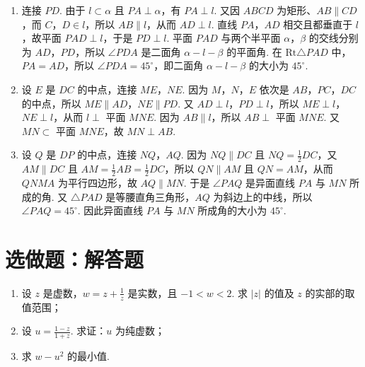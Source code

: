 \begin{solution}
\begin{enumerate}
\item 连接 \(PD\). 由于 \(l\subset\alpha\) 且 \(PA\perp\alpha\)，有 \(PA\perp l\). 又因 \(ABCD\) 为矩形、\(AB\parallel CD\)，而 \(C\)，\(D\in l\)，所以 \(AB\parallel l\)，从而 \(AD\perp l\). 直线 \(PA\)，\(AD\) 相交且都垂直于 \(l\)，故平面 \(PAD\perp l\)，于是 \(PD\perp l\). 平面 \(PAD\) 与两个半平面 \(\alpha\)，\(\beta\) 的交线分别为 \(AD\)，\(PD\)，所以 \(\angle PDA\) 是二面角 \(\alpha-l-\beta\) 的平面角. 在 \(\mathrm{Rt}\triangle PAD\) 中，\(PA=AD\)，所以 \(\angle PDA=45^\circ\)，即二面角 \(\alpha-l-\beta\) 的大小为 \(45^\circ\).
\item 设 \(E\) 是 \(DC\) 的中点，连接 \(ME\)，\(NE\). 因为 \(M\)，\(N\)，\(E\) 依次是 \(AB\)，\(PC\)，\(DC\) 的中点，所以 \(ME\parallel AD\)，\(NE\parallel PD\). 又 \(AD\perp l\)，\(PD\perp l\)，所以 \(ME\perp l\)，\(NE\perp l\)，从而 \(l\perp\) 平面 \(MNE\). 因为 \(AB\parallel l\)，所以 \(AB\perp\) 平面 \(MNE\). 又 \(MN\subset\) 平面 \(MNE\)，故 \(MN\perp AB\).
\item 设 \(Q\) 是 \(DP\) 的中点，连接 \(NQ\)，\(AQ\). 因为 \(NQ\parallel DC\) 且 \(NQ=\frac{1}{2}DC\)，又 \(AM\parallel DC\) 且 \(AM=\frac{1}{2}AB=\frac{1}{2}DC\)，所以 \(QN\parallel AM\) 且 \(QN=AM\)，从而 \(QNMA\) 为平行四边形，故 \(AQ\parallel MN\). 于是 \(\angle PAQ\) 是异面直线 \(PA\) 与 \(MN\) 所成的角. 又 \(\triangle PAD\) 是等腰直角三角形，\(AQ\) 为斜边上的中线，所以 \(\angle PAQ=45^\circ\). 因此异面直线 \(PA\) 与 \(MN\) 所成角的大小为 \(45^\circ\).
\end{enumerate}
\end{solution}

\section{选做题：解答题}

\begin{problem}[A]
\begin{enumerate}
\item 设 \(z\) 是虚数，\(w=z+\frac{1}{z}\) 是实数，且 \(-1<w<2\). 求 \(\left|z\right|\) 的值及 \(z\) 的实部的取值范围；
\item 设 \(u=\frac{1-z}{1+z}\). 求证：\(u\) 为纯虚数；
\item 求 \(w-u^{2}\) 的最小值.
\end{enumerate}
\end{problem}

